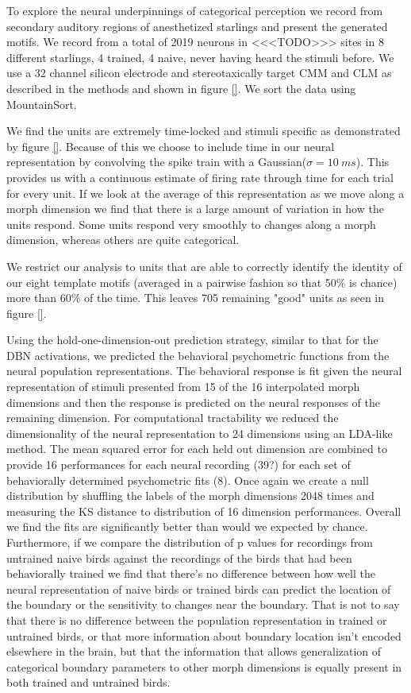 To explore the neural underpinnings of categorical perception we record from secondary auditory regions of anesthetized starlings and present the generated motifs. We record from a total of 2019 neurons in <<<TODO>>> sites in 8 different starlings, 4 trained, 4 naive, never having heard the stimuli before. We use a 32 channel silicon electrode and stereotaxically target \ac{CMM} and \ac{CLM} as described in the methods and shown in figure \ref{}. We sort the data using MountainSort\cite{mountainsort}. 

We find the units are extremely time-locked and stimuli specific as demonstrated by figure \ref{}. Because of this we choose to include time in our neural representation by convolving the spike train with a Gaussian($\sigma = \SI{10}{ms}$). This provides us with a continuous estimate of firing rate through time for each trial for every unit. If we look at the average of this representation as we move along a morph dimension we find that there is a large amount of variation in how the units respond. Some units respond very smoothly to changes along a morph dimension, whereas others are quite categorical.

We restrict our analysis to units that are able to correctly identify the identity of our eight template motifs (averaged in a pairwise fashion so that 50\% is chance) more than 60\% of the time. This leaves 705 remaining "good" units as seen in figure \ref{}.

Using the hold-one-dimension-out prediction strategy, similar to that for the DBN activations, we predicted the behavioral psychometric functions from the neural population representations. The behavioral response is fit given the neural representation of stimuli presented from 15 of the 16 interpolated morph dimensions and then the response is predicted on the neural responses of the remaining dimension. For computational tractability we reduced the dimensionality of the neural representation to 24 dimensions using an LDA-like method. The mean squared error for each held out dimension are combined to provide 16 performances for each neural recording (39?) for each set of behaviorally determined psychometric fits (8). Once again we create a null distribution by shuffling the labels of the morph dimensions 2048 times and measuring the KS distance to distribution of 16 dimension performances. Overall we find the fits are significantly better than would we expected by chance. Furthermore, if we compare the distribution of p values for recordings from untrained naive birds against the recordings of the birds that had been behaviorally trained we find that there's no difference between how well the neural representation of naive birds or trained birds can predict the location of the boundary or the sensitivity to changes near the boundary. That is not to say that there is no difference between the population representation in trained or untrained birds, or that more information about boundary location isn't encoded elsewhere in the brain, but that the information that allows generalization of categorical boundary parameters to other morph dimensions is equally present in both trained and untrained birds.

